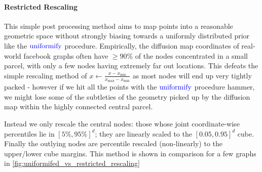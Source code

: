 \paragraph{Restricted Rescaling} This simple post processing method aims to map points into a reasonable geometric space without strongly biasing towards a uniformly distributed prior like the $\operatorname{\textcolor{blue}{uniformify}}$ procedure.
Empirically, the diffusion map coordinates of real-world facebook graphs often have $\geq 90\%$ of the nodes concentrated in a small parcel, with only a few nodes having extremely far out locations.
This defeats the simple rescaling method of $x \gets \frac{x - x_{\min}}{x_{\max} - x_{\min}}$ as most nodes will end up very tightly packed - however if we hit all the points with the $\operatorname{\textcolor{blue}{uniformify}}$ procedure hammer, we might lose some of the subtleties of the geometry picked up by the diffusion map within the highly connected central parcel.

Instead we only rescale the central nodes: those whose joint coordinate-wise percentiles lie in $[5\%, 95\%]^d$; they are linearly scaled to the $[0.05, 0.95]^d$ cube. Finally the outlying nodes are percentile rescaled (non-linearly) to the upper/lower cube margins.
This method is shown in comparison for a few graphs in \cref{fig:uniformifed_vs_restricted_rescaling}







